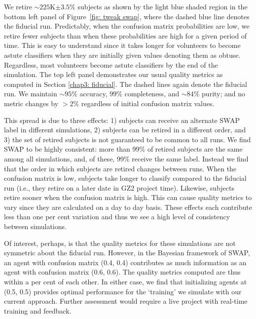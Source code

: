 We retire $\sim$$225$K$\pm3.5\%$ subjects as shown by the light blue shaded region in the bottom left panel of Figure~\ref{fig: tweak swap}, where the dashed blue line denotes the fiducial run. Predictably, when the confusion matrix probabilities are low, we retire fewer subjects than when these probabilities are high for a given period of time. This is easy to understand since it takes longer for volunteers to become astute classifiers when they are initially given values denoting them as obtuse. Regardless, most volunteers become astute classifiers by the end of the simulation. The top left panel demonstrates our usual quality metrics as computed in Section \ref{chap3: fiducial}. The dashed lines again denote the fiducial run. We maintain $\sim$$95\%$ accuracy, $99\%$ completeness, and $\sim$$84\%$ purity;  and no metric changes by $> 2\%$ regardless of initial confusion matrix values.  
 
This spread is due to three effects: 
1) subjects can receive an alternate SWAP label in different simulations, 
2) subjects can be retired in a different order, and 
3) the set of retired subjects is not guaranteed to be common to all runs. 
We find SWAP to be highly consistent: more than 99\% of retired subjects are the same among all simulations, and, of these, 99\% receive the same label.  Instead we find that the order in which subjects are retired changes between runs. When the confusion matrix is low, subjects take longer to classify compared to the fiducial run (i.e., they retire on a later date in GZ2 project time). Likewise, subjects retire sooner when the confusion matrix is high. This can cause quality metrics to vary since they are calculated on a day to day basis. These effects each contribute less than one per cent variation and thus we see a high level of consistency between simulations. 

Of interest, perhaps, is that the quality metrics for these simulations are not symmetric about the fiducial run. However, in the Bayesian framework of SWAP, an agent with confusion matrix (0.4, 0.4) contributes as much information as an agent with confusion matrix (0.6, 0.6). The quality metrics computed are thus within a per cent of each other. In either case, we find that initializing agents at (0.5, 0.5) provides optimal performance for the `training' we simulate with our current approach. Further assessment would require a live project with real-time training and feedback. 


